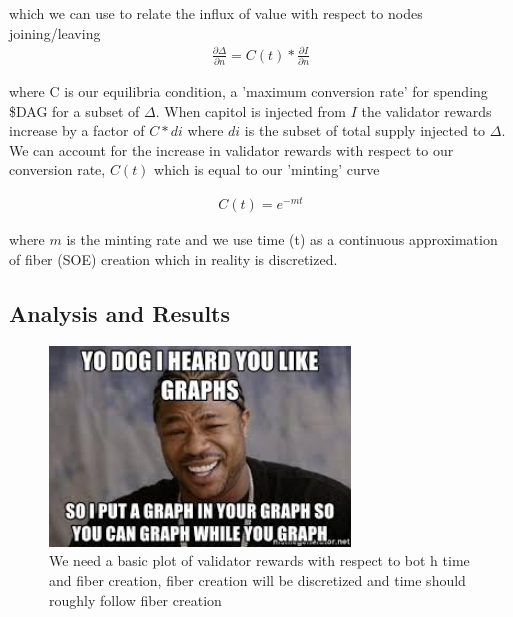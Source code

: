 \documentclass{article}
\begin{document}
which we can use to relate the influx of value with respect to nodes joining/leaving
\begin{equation*} \label{eq1}
\begin{split}
\frac{\partial \Delta}{\partial n} = C(t)* \frac{\partial I}{\partial n}
\end{split}
\end{equation*}

where C is our equilibria condition, a 'maximum conversion rate' for spending \$DAG for a subset of $\Delta$. When capitol is injected from $I$ the validator rewards increase by a factor of $C*di$ where $di$ is the subset of total supply injected to $\Delta$. We can account for the increase in validator rewards with respect to our conversion rate, $C(t)$ which is equal to our 'minting' curve

\begin{equation*} \label{eq1}
\begin{split}
C(t) = e^{-mt}
\end{split}
\end{equation*}

where $m$ is the minting rate and we use time (t) as a continuous approximation of fiber (SOE) creation which in reality is discretized.
\subsection{Analysis and Results}
\begin{figure}[h]
\caption{We need a basic plot of validator rewards with respect to bot h time and fiber creation, fiber creation will be discretized and time should roughly follow fiber creation}
\includegraphics[width=8cm]{yo_dawg}
\centering
\end{figure}
\end{document}
